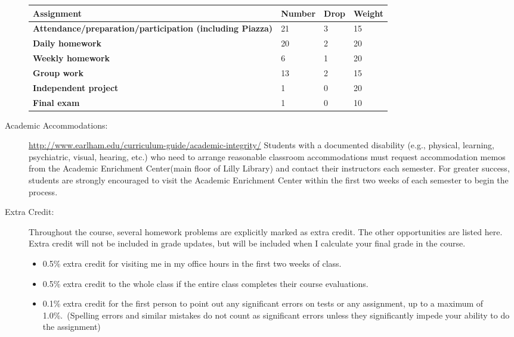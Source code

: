\documentclass[12pt]{article}
\begin{document}
\begin{description}
\setlength{\arrayrulewidth}{1mm}
\setlength{\tabcolsep}{8pt}
{
\begin{table}[H]
\label{tab:my-table}
\begin{tabular}{llll}
\hline
\textbf{Assignment}                                              & \textbf{Number} & \textbf{Drop} & \textbf{Weight} \\ \hline
\textbf{Attendance/preparation/participation (including Piazza)} & 21     & 3    & 15     \\
\textbf{Daily homework }                                         & 20     & 2    & 20     \\
\textbf{Weekly homework }                                        & 6      & 1    & 20     \\
\textbf{Group work }                                             & 13     & 2    & 15     \\
\textbf{Independent project }                                    & 1      & 0    & 20     \\
\textbf{Final exam }                                              & 1      & 0    & 10     \\ \hline
\end{tabular}
\end{table}
}

\newpage

\item[Academic Accommodations:] {\small \url{http://www.earlham.edu/curriculum-guide/academic-integrity/}}
 Students with a documented disability (e.g., physical, learning, psychiatric, visual, hearing, etc.) who need to arrange reasonable classroom accommodations must request accommodation memos from the Academic Enrichment Center(main floor of Lilly Library) and contact their instructors each semester. For greater success, students are strongly encouraged to visit the Academic Enrichment Center within the first two weeks of each semester to begin the process.
  
\item[Extra Credit:]
  Throughout the course, several homework problems are explicitly marked as extra credit. The other opportunities are listed here. Extra credit will not be included in grade updates, but will be included when I calculate your final grade in the course.
  \begin{itemize}
  \item 0.5\% extra credit for visiting me in my office hours in the first two weeks of class.
  \item 0.5\% extra credit to the whole class if the entire class completes their course evaluations.
  \item 0.1\% extra credit for the first person to point out any significant errors on tests or any assignment, up to a maximum of 1.0\%.\ (Spelling errors and similar mistakes do not count as significant errors unless they significantly impede your ability to do the assignment) 
    \end{itemize}


\end{description}
\end{document}
